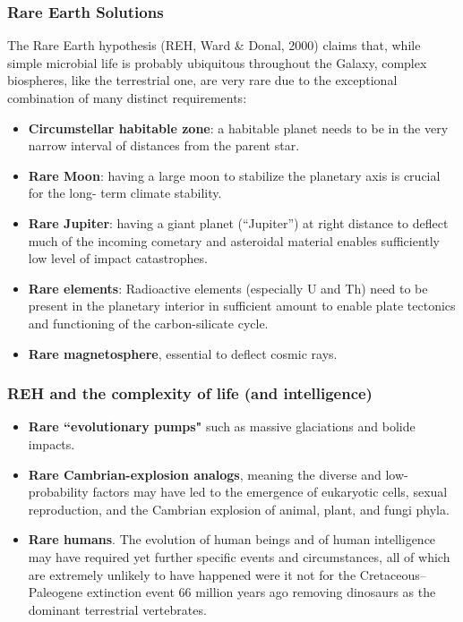 \begin{frame}
\frametitle{Rare Earth Solutions}
The Rare Earth hypothesis (REH, Ward \& Donal, 2000) claims that, while simple microbial life is probably ubiquitous throughout the Galaxy, complex biospheres, like the terrestrial one, are very rare due to the exceptional combination of many distinct requirements:
\begin{itemize}
\item {\bf Circumstellar habitable zone}: a habitable planet needs to be in the very narrow interval of distances from the parent star.
\item {\bf Rare Moon}: having a large moon to stabilize the planetary axis is crucial for the long- term climate stability.
\item {\bf Rare Jupiter}: having a giant planet (``Jupiter'') at right distance to deflect much of the incoming cometary and asteroidal material enables sufficiently low level of impact catastrophes.
\item {\bf Rare elements}: Radioactive elements (especially U and Th) need to be present in the planetary interior in sufficient amount to enable plate tectonics and functioning of the carbon-silicate cycle.
\item {\bf Rare magnetosphere}, essential to deflect cosmic rays.  
\end{itemize}
\end{frame}


\begin{frame}
\frametitle{REH and the complexity of life (and intelligence)}

\begin{itemize}
\item {\bf Rare ``evolutionary pumps"} such as massive glaciations and bolide impacts.
\item {\bf Rare Cambrian-explosion analogs}, meaning the diverse and low-probability factors may have led to the emergence of eukaryotic cells, sexual reproduction, and the Cambrian explosion of animal, plant, and fungi phyla.  
\item {\bf Rare humans}. The evolution of human beings and of human intelligence may have required yet further specific events and circumstances, all of which are extremely unlikely to have happened were it not for the Cretaceous--Paleogene extinction event 66 million years ago removing dinosaurs as the dominant terrestrial vertebrates. 
\end{itemize}


\end{frame}

